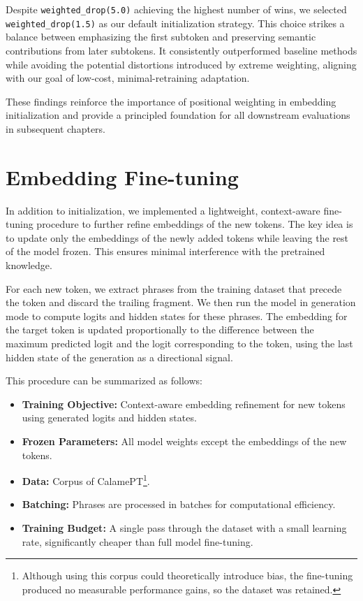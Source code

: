 Despite \texttt{weighted\_drop(5.0)} achieving the highest number of wins, we selected \texttt{weighted\_drop(1.5)} as our default initialization strategy. This choice strikes a balance between emphasizing the first subtoken and preserving semantic contributions from later subtokens. It consistently outperformed baseline methods while avoiding the potential distortions introduced by extreme weighting, aligning with our goal of low-cost, minimal-retraining adaptation.

These findings reinforce the importance of positional weighting in embedding initialization and provide a principled foundation for all downstream evaluations in subsequent chapters.




\section{Embedding Fine-tuning}
\label{sec:embedding_finetune}

In addition to initialization, we implemented a lightweight, context-aware fine-tuning procedure to further refine embeddings of the new tokens. The key idea is to update only the embeddings of the newly added tokens while leaving the rest of the model frozen. This ensures minimal interference with the pretrained knowledge. 

For each new token, we extract phrases from the training dataset that precede the token and discard the trailing fragment. We then run the model in generation mode to compute logits and hidden states for these phrases. The embedding for the target token is updated proportionally to the difference between the maximum predicted logit and the logit corresponding to the token, using the last hidden state of the generation as a directional signal.  

This procedure can be summarized as follows:
\begin{itemize}
    \item \textbf{Training Objective:} Context-aware embedding refinement for new tokens using generated logits and hidden states.
    \item \textbf{Frozen Parameters:} All model weights except the embeddings of the new tokens.
    \item \textbf{Data:} Corpus of CalamePT\footnote{Although using this corpus could theoretically introduce bias, the fine-tuning produced no measurable performance gains, so the dataset was retained.}.
    \item \textbf{Batching:} Phrases are processed in batches for computational efficiency.
    \item \textbf{Training Budget:} A single pass through the dataset with a small learning rate, significantly cheaper than full model fine-tuning.
\end{itemize}

